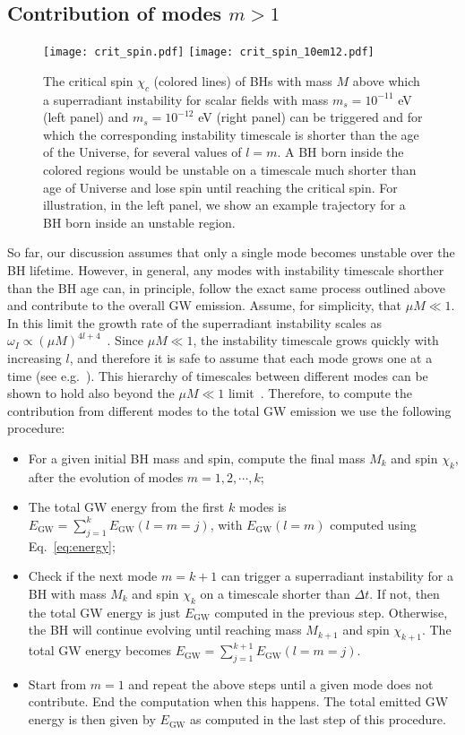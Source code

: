 \documentclass[
reprint,           %
superscriptaddress,%
amsmath,           %
amssymb,           %
aps,               %
prd,               %
notitlepage,       %
floatfix,          %
nofootinbib %
]{revtex4-1}
\begin{document}
\subsection{Contribution of modes $m>1$}
%
\begin{figure*}[htbp!]
	\centering
	\texttt{[image: crit\_spin.pdf]}
	\texttt{[image: crit\_spin\_10em12.pdf]}
	\caption{\label{critspin} The critical spin $\chi_c$ (colored lines) of BHs with mass $M$ above which a superradiant instability for scalar fields with mass $m_s=10^{-11}$ eV (left panel) and $m_s=10^{-12}$ eV (right panel) can be triggered and for which the corresponding instability timescale is shorter than the age of the Universe, for several values of $l=m$. A BH born inside the colored regions would be unstable on a timescale much shorter than age of Universe and lose spin until reaching the critical spin. For illustration, in the left panel, we show an example trajectory for a BH born inside an unstable region.
	}
\end{figure*}
%
So far, our discussion assumes that only a single mode becomes unstable over the BH lifetime. However, in general, any modes with instability timescale shorther than the BH age can, in principle, follow the exact same process outlined above and contribute to the overall GW emission.
%
Assume, for simplicity, that $\mu M\ll 1$. In this limit the growth rate of the superradiant instability scales as $\omega_I\propto {(\mu M)}^{4l+4}$~\cite{Detweiler:1980uk}. Since $\mu M\ll 1$, the instability timescale grows quickly with increasing $l$, and therefore it is safe to assume that each mode grows one at a time (see e.g.~\cite{Ficarra:2018rfu}). This hierarchy of timescales between different modes can be shown to hold also beyond the $\mu M\ll 1$ limit~\cite{Dolan:2007mj,Eperon:2019viw}. Therefore, to compute the contribution from different modes to the total GW emission we use the following procedure:
\begin{itemize}
	\item For a given initial BH mass and spin, compute the final mass $M_{k}$ and spin $\chi_{k}$, after the evolution of modes $m=1,2,\cdots,k$;
	\item The total GW energy from the first $k$ modes is $E_\mathrm{GW}=\sum_{j=1}^{k}E_\mathrm{GW}(l=m=j)$, with $E_\mathrm{GW}(l=m)$ computed using Eq.~\eqref{eq:energy};
	\item Check if the next mode $m=k+1$ can trigger a superradiant instability for a BH with mass $M_{k}$ and spin $\chi_{k}$ on a timescale shorter than $\Delta t$. If not, then the total GW energy is just $E_\mathrm{GW}$ computed in the previous step. Otherwise, the BH will continue evolving until reaching mass $M_{k+1}$ and spin $\chi_{k+1}$. The total GW energy becomes $E_\mathrm{GW}=\sum_{j=1}^{k+1}E_\mathrm{GW}(l=m=j)$.
	\item Start from $m=1$ and repeat the above steps until a given mode does not contribute. End the computation when this happens. The total emitted GW energy is then given by $E_\mathrm{GW}$ as computed in the last step of this procedure.
\end{itemize}
\end{document}
